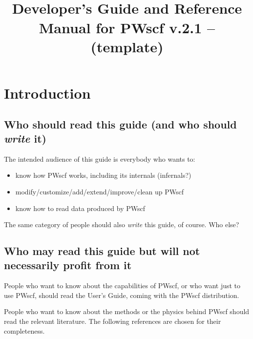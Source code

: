 \documentclass[12pt,a4paper]{article}
\def\version{2.1}
\begin{document}
 

\author{}
\date{}
\title{
  \hfill%
  \vspace{1.5cm}
  \\
  \huge Developer's Guide and Reference Manual for PWscf v.\version
        -- (template)
}
\maketitle

\tableofcontents

\clearpage

\section{Introduction}

\subsection{Who should read this guide (and who should {\em write} it)}

The intended audience of this guide is everybody who wants to:
\begin{itemize}
  \item know how PWscf works, including its internals (infernals?)
  \item modify/customize/add/extend/improve/clean up PWscf
  \item know how to read data produced by PWscf
\end{itemize}
The same category of people should also {\em write} this guide, of course.
Who else?

\subsection{Who may read this guide but will not necessarily
profit from it}

People who want to know about the capabilities of PWscf,
or who want just to use PWscf, should read the User's Guide, 
coming with the PWscf distribution.

People who want to know about the methods or the physics
behind PWscf should read the relevant literature. The
following references are chosen for their completeness.
\medskip
\end{document}
